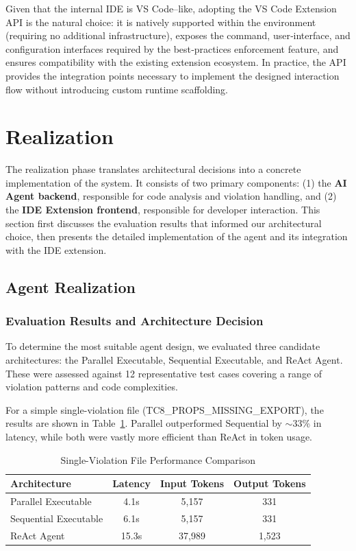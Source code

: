 \begin{spacing}{1.2}
Given that the internal IDE is VS Code–like, adopting the VS Code Extension API is the natural choice: it is natively supported within the environment (requiring no additional infrastructure), exposes the command, user‑interface, and configuration interfaces required by the best‑practices enforcement feature, and ensures compatibility with the existing extension ecosystem. In practice, the API provides the integration points necessary to implement the designed interaction flow without introducing custom runtime scaffolding.


\section{Realization}

The realization phase translates architectural decisions into a concrete implementation of the system. 
It consists of two primary components: (1) the \textbf{AI Agent backend}, responsible for code analysis 
and violation handling, and (2) the \textbf{IDE Extension frontend}, responsible for developer interaction. 
This section first discusses the evaluation results that informed our architectural choice, then presents 
the detailed implementation of the agent and its integration with the IDE extension.

\subsection{Agent Realization}

\subsubsection{Evaluation Results and Architecture Decision}
To determine the most suitable agent design, we evaluated three candidate architectures: the Parallel Executable, 
Sequential Executable, and ReAct Agent. These were assessed against 12 representative test cases covering 
a range of violation patterns and code complexities.  

For a simple single-violation file (TC8\_PROPS\_MISSING\_EXPORT), the results are shown in 
Table~\ref{tab:single_violation_performance_ch4}. Parallel outperformed Sequential by $\sim$33\% in latency, 
while both were vastly more efficient than ReAct in token usage.

\begin{table}[H]
\centering
\caption{Single-Violation File Performance Comparison}
\label{tab:single_violation_performance_ch4}
\footnotesize
\begin{tabular}{|l|c|c|c|}
\hline 
\textbf{Architecture} & \textbf{Latency} & \textbf{Input Tokens} & \textbf{Output Tokens} \\
\hline 
Parallel Executable & 4.1s & 5,157 & 331 \\
\hline
Sequential Executable & 6.1s & 5,157 & 331 \\
\hline
ReAct Agent & 15.3s & 37,989 & 1,523 \\
\hline
\end{tabular}
\end{table}


\end{spacing}

